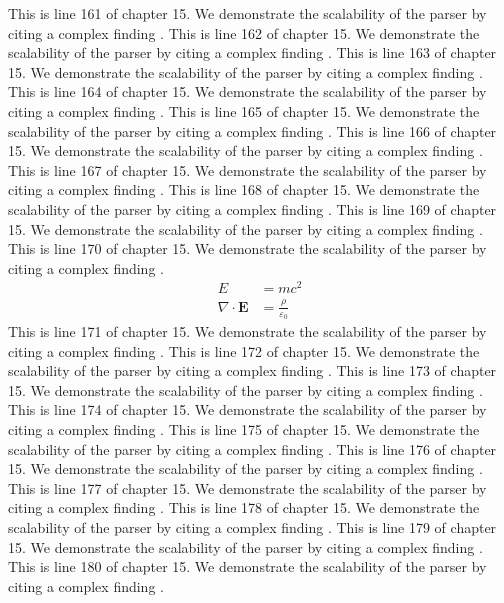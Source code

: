 This is line 161 of chapter 15. We demonstrate the scalability of the parser by citing a complex finding \cite{ref15_161}.
This is line 162 of chapter 15. We demonstrate the scalability of the parser by citing a complex finding \cite{ref15_162}.
This is line 163 of chapter 15. We demonstrate the scalability of the parser by citing a complex finding \cite{ref15_163}.
This is line 164 of chapter 15. We demonstrate the scalability of the parser by citing a complex finding \cite{ref15_164}.
This is line 165 of chapter 15. We demonstrate the scalability of the parser by citing a complex finding \cite{ref15_165}.
This is line 166 of chapter 15. We demonstrate the scalability of the parser by citing a complex finding \cite{ref15_166}.
This is line 167 of chapter 15. We demonstrate the scalability of the parser by citing a complex finding \cite{ref15_167}.
This is line 168 of chapter 15. We demonstrate the scalability of the parser by citing a complex finding \cite{ref15_168}.
This is line 169 of chapter 15. We demonstrate the scalability of the parser by citing a complex finding \cite{ref15_169}.
This is line 170 of chapter 15. We demonstrate the scalability of the parser by citing a complex finding \cite{ref15_170}.
\begin{align*}
  E &= mc^2 \\
  \nabla \cdot \mathbf{E} &= \frac{\rho}{\varepsilon_0}
\end{align*}
This is line 171 of chapter 15. We demonstrate the scalability of the parser by citing a complex finding \cite{ref15_171}.
This is line 172 of chapter 15. We demonstrate the scalability of the parser by citing a complex finding \cite{ref15_172}.
This is line 173 of chapter 15. We demonstrate the scalability of the parser by citing a complex finding \cite{ref15_173}.
This is line 174 of chapter 15. We demonstrate the scalability of the parser by citing a complex finding \cite{ref15_174}.
This is line 175 of chapter 15. We demonstrate the scalability of the parser by citing a complex finding \cite{ref15_175}.
This is line 176 of chapter 15. We demonstrate the scalability of the parser by citing a complex finding \cite{ref15_176}.
This is line 177 of chapter 15. We demonstrate the scalability of the parser by citing a complex finding \cite{ref15_177}.
This is line 178 of chapter 15. We demonstrate the scalability of the parser by citing a complex finding \cite{ref15_178}.
This is line 179 of chapter 15. We demonstrate the scalability of the parser by citing a complex finding \cite{ref15_179}.
This is line 180 of chapter 15. We demonstrate the scalability of the parser by citing a complex finding \cite{ref15_180}.
